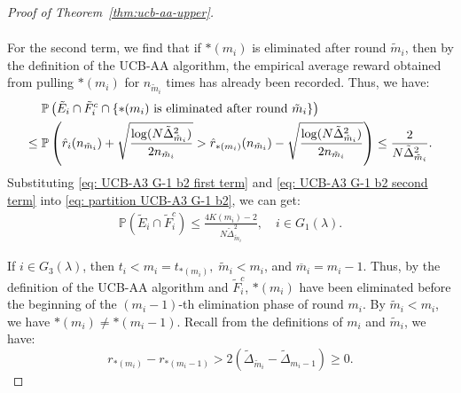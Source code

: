 \documentclass[
  12pt]{article}
\begin{document}
\begin{proof}[Proof of Theorem~\ref{thm:ucb-aa-upper}]
\begin{itemize}
\begin{align}
\label{eq: UCB-A3 G-1 b2 first term}
\end{align}
For the second term, we find that if $*(m_i)$ is eliminated after round $\tilde{m}_i$, then by the definition of the UCB-AA algorithm, the empirical average reward obtained from pulling $*(m_i)$ for $n_{\tilde{m}_i}$ times has already been recorded. Thus, we have:
\begin{align}
    &\;\mathbb{P}\left(\tilde{E}_i\cap\tilde{F}_i^c\cap\{\text{$*(m_i)$ is eliminated after round }\tilde{m}_i\}\right)\notag\\
\leq &\;\mathbb{P}\left(\hat{r}_i(n_{\tilde{m}_i}) + \sqrt{\frac{\log(N \tilde{\Delta}_{\tilde{m}_i}^2)}{2n_{\tilde{m}_i}}} >\hat{r}_{*(m_i)}(n_{\tilde{m}_i}) - \sqrt{\frac{\log(N \tilde{\Delta}_{\tilde{m}_i}^2)}{2n_{\tilde{m}_i}}}\right)\leq \frac{2}{N\tilde{\Delta}_{\tilde{m}_i}^2}.
\label{eq: UCB-A3 G-1 b2 second term}
\end{align}
Substituting \eqref{eq: UCB-A3 G-1 b2 first term} and \eqref{eq: UCB-A3 G-1 b2 second term} into \eqref{eq: partition UCB-A3 G-1 b2}, we can get:
\begin{align}
    \mathbb{P}\left(\tilde{E}_i\cap\tilde{F}_i^c\right)\leq \frac{4K(m_i)-2}{N\tilde{\Delta}_{\tilde{m}_i}^2},\quad i\in G_1(\lambda).
    \label{eq: UCB-A3 G-1 b2}
\end{align}
\end{itemize}

If $i\in G_3(\lambda)$, then $t_i<m_i=t_{*(m_i)},\; \tilde{m}_i<m_i$, and $\overline{m}_i=m_i-1$. Thus, by the definition of the UCB-AA algorithm and $\tilde{F}_i^c$, $*(m_i)$ have been eliminated before the beginning of the $(m_i-1)$-th elimination phase of round $m_i$. By $\tilde{m}_i<m_i$, we have $*(m_i)\neq *(m_i-1)$. Recall from the definitions of $m_i$ and $\tilde{m}_i$, we have:
\[r_{*(m_i)}-r_{*(m_i-1)}>2\left(\tilde{\Delta}_{\tilde{m}_i}-\tilde{\Delta}_{m_i-1}\right)\geq 0.\]


\end{proof}
\end{document}
